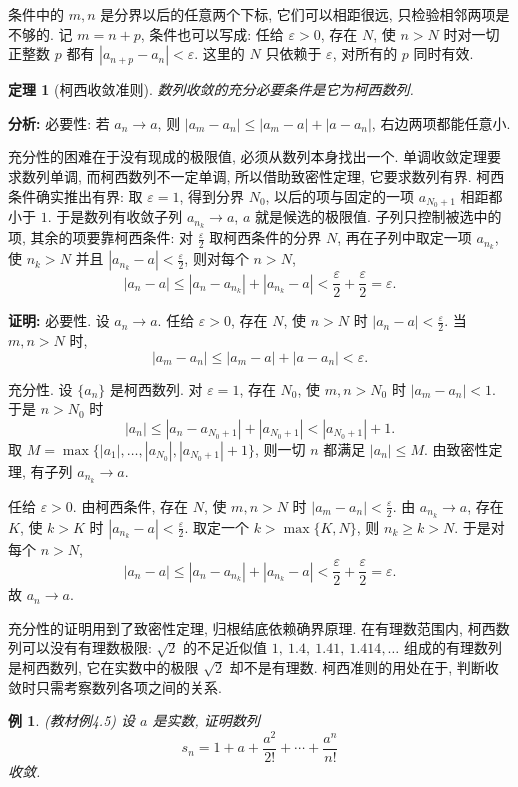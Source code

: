 \documentclass[UTF8,openany]{ctexbook}
\theoremstyle{chinesetextbook}
\newtheorem{example}{例}[section]
\newtheorem{theorem}{定理}[section]
\newenvironment{cnproof}{\par\indent\textbf{证明:} \ignorespaces}{\par}
\begin{document}
条件中的 $m,n$ 是分界以后的任意两个下标, 它们可以相距很远, 只检验相邻两项是不够的. 记 $m=n+p$, 条件也可以写成: 任给 $\varepsilon>0$, 存在 $N$, 使 $n>N$ 时对一切正整数 $p$ 都有 $|a_{n+p}-a_n|<\varepsilon$. 这里的 $N$ 只依赖于 $\varepsilon$, 对所有的 $p$ 同时有效.
\begin{theorem}[柯西收敛准则]
数列收敛的充分必要条件是它为柯西数列.
\end{theorem}
\par\indent\textbf{分析:} 必要性: 若 $a_n\to a$, 则 $|a_m-a_n|\le|a_m-a|+|a-a_n|$, 右边两项都能任意小.

充分性的困难在于没有现成的极限值, 必须从数列本身找出一个. 单调收敛定理要求数列单调, 而柯西数列不一定单调, 所以借助致密性定理, 它要求数列有界. 柯西条件确实推出有界: 取 $\varepsilon=1$, 得到分界 $N_0$, 以后的项与固定的一项 $a_{N_0+1}$ 相距都小于 $1$. 于是数列有收敛子列 $a_{n_k}\to a$, $a$ 就是候选的极限值. 子列只控制被选中的项, 其余的项要靠柯西条件: 对 $\displaystyle\frac\varepsilon2$ 取柯西条件的分界 $N$, 再在子列中取定一项 $a_{n_k}$, 使 $n_k>N$ 并且 $\displaystyle|a_{n_k}-a|<\frac\varepsilon2$, 则对每个 $n>N$,
\[
|a_n-a|\le|a_n-a_{n_k}|+|a_{n_k}-a|<\frac\varepsilon2+\frac\varepsilon2=\varepsilon.
\]
\begin{cnproof}
必要性. 设 $a_n\to a$. 任给 $\varepsilon>0$, 存在 $N$, 使 $n>N$ 时 $\displaystyle|a_n-a|<\frac\varepsilon2$. 当 $m,n>N$ 时,
\[
|a_m-a_n|\le|a_m-a|+|a-a_n|<\varepsilon.
\]

充分性. 设 $\{a_n\}$ 是柯西数列. 对 $\varepsilon=1$, 存在 $N_0$, 使 $m,n>N_0$ 时 $|a_m-a_n|<1$. 于是 $n>N_0$ 时
\[
|a_n|\le|a_n-a_{N_0+1}|+|a_{N_0+1}|<|a_{N_0+1}|+1.
\]
取 $M=\max\{|a_1|,\ldots,|a_{N_0}|,|a_{N_0+1}|+1\}$, 则一切 $n$ 都满足 $|a_n|\le M$. 由致密性定理, 有子列 $a_{n_k}\to a$.

任给 $\varepsilon>0$. 由柯西条件, 存在 $N$, 使 $m,n>N$ 时 $\displaystyle|a_m-a_n|<\frac\varepsilon2$. 由 $a_{n_k}\to a$, 存在 $K$, 使 $k>K$ 时 $\displaystyle|a_{n_k}-a|<\frac\varepsilon2$. 取定一个 $k>\max\{K,N\}$, 则 $n_k\ge k>N$. 于是对每个 $n>N$,
\[
|a_n-a|\le|a_n-a_{n_k}|+|a_{n_k}-a|<\frac\varepsilon2+\frac\varepsilon2=\varepsilon.
\]
故 $a_n\to a$.
\end{cnproof}
充分性的证明用到了致密性定理, 归根结底依赖确界原理. 在有理数范围内, 柯西数列可以没有有理数极限: $\sqrt2$ 的不足近似值 $1,\ 1.4,\ 1.41,\ 1.414,\ldots$ 组成的有理数列是柯西数列, 它在实数中的极限 $\sqrt2$ 却不是有理数. 柯西准则的用处在于, 判断收敛时只需考察数列各项之间的关系.
\begin{example}\label{ex:4-5}
\textnormal{(教材例4.5)} 设 $a$ 是实数, 证明数列
\[
s_n=1+a+\frac{a^2}{2!}+\cdots+\frac{a^n}{n!}
\]
收敛.
\end{example}
\end{document}
